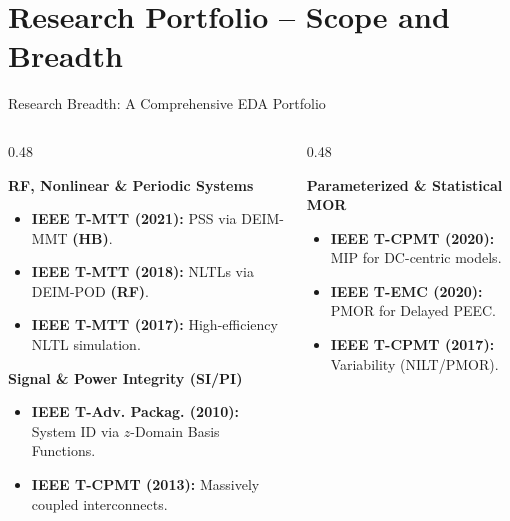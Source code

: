 \section{Research Portfolio -- Scope and Breadth}

\begin{frame}[t]{Research Breadth: A Comprehensive EDA Portfolio}
	\begin{columns}[t, onlytextwidth]

		\begin{column}{0.48\textwidth}
			\begin{exampleblock}{\small \textbf{RF, Nonlinear \& Periodic Systems}}
				\small
				\begin{itemize}
					\item \textbf{IEEE T-MTT (2021):} PSS via DEIM-MMT \textbf{(HB)}.
					\item \textbf{IEEE T-MTT (2018):} NLTLs via DEIM-POD \textbf{(RF)}.
					\item \textbf{IEEE T-MTT (2017):} High-efficiency NLTL simulation.
				\end{itemize}
			\end{exampleblock}

			\vspace{0.5ex}

			\begin{exampleblock}{\small \textbf{Signal \& Power Integrity (SI/PI)}}
				\small
				\begin{itemize}
					\item \textbf{IEEE T-Adv. Packag. (2010):} System ID via $z$-Domain Basis Functions.
					\item \textbf{IEEE T-CPMT (2013):} Massively coupled interconnects.
				\end{itemize}
			\end{exampleblock}
		\end{column}

		\begin{column}{0.48\textwidth}
			\begin{exampleblock}{\small \textbf{Parameterized \& Statistical MOR}}
				\small
				\begin{itemize}
					\item \textbf{IEEE T-CPMT (2020):} MIP for DC-centric models.
					\item \textbf{IEEE T-EMC (2020):} PMOR for Delayed PEEC.
					\item \textbf{IEEE T-CPMT (2017):} Variability (NILT/PMOR).
				\end{itemize}
			\end{exampleblock}


\end{column}
\end{columns}
\end{frame}
